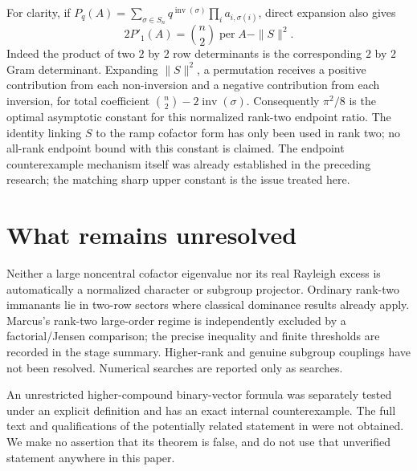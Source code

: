 \documentclass[11pt]{article}
\DeclareMathOperator{\per}{per}
\begin{document}
For clarity, if $P_q(A)=\sum_{\sigma\in S_n}q^{\operatorname{inv}(\sigma)}
\prod_i a_{i,\sigma(i)}$, direct expansion also gives
\[
 2P'_1(A)=\binom n2\per A-\|S\|^2.
\]
Indeed the product of two $2$ by $2$ row determinants is the corresponding
$2$ by $2$ Gram determinant. Expanding $\|S\|^2$, a permutation receives a
positive contribution from each non-inversion and a negative contribution
from each inversion, for total coefficient $\binom n2-2\operatorname{inv}(\sigma)$.
Consequently $\pi^2/8$ is the optimal asymptotic constant for this normalized
rank-two endpoint ratio. The identity linking $S$ to the ramp cofactor form
has only been used in rank two; no all-rank endpoint bound with this constant
is claimed. The endpoint counterexample mechanism itself was already
established in the preceding research; the matching sharp upper constant is
the issue treated here.

\section{What remains unresolved}
Neither a large noncentral cofactor eigenvalue nor its real Rayleigh excess
is automatically a normalized character or subgroup projector. Ordinary
rank-two immanants lie in two-row sectors where classical dominance results
already apply. Marcus's rank-two large-order regime is independently excluded
by a factorial/Jensen comparison; the precise inequality and finite thresholds
are recorded in the stage summary. Higher-rank and genuine subgroup couplings
have not been resolved. Numerical searches are reported only as searches.

An unrestricted higher-compound binary-vector formula was separately tested
under an explicit definition and has an exact internal counterexample. The
full text and qualifications of the potentially related statement in
\cite{pate08} were not obtained. We make no assertion that its theorem is
false, and do not use that unverified statement anywhere in this paper.
\end{document}
